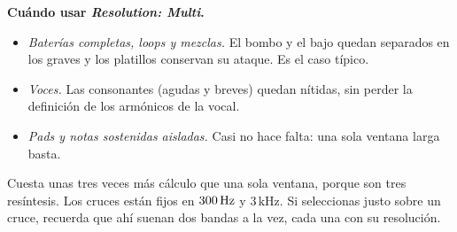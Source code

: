 \begin{estudio}
\textbf{Cuándo usar \emph{Resolution: Multi}.}
\begin{itemize}
  \item \emph{Baterías completas, loops y mezclas.} El bombo y el bajo quedan separados en los
        graves y los platillos conservan su ataque. Es el caso típico.
  \item \emph{Voces.} Las consonantes (agudas y breves) quedan nítidas, sin perder la definición
        de los armónicos de la vocal.
  \item \emph{Pads y notas sostenidas aisladas.} Casi no hace falta: una sola ventana larga basta.
\end{itemize}
Cuesta unas tres veces más cálculo que una sola ventana, porque son tres resíntesis. Los cruces
están fijos en $300\,\mathrm{Hz}$ y $3\,\mathrm{kHz}$. Si seleccionas justo sobre un cruce, recuerda que ahí
suenan dos bandas a la vez, cada una con su resolución.
\end{estudio}
